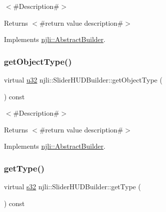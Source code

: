 $<$\#\+Description\#$>$

\begin{DoxyReturn}{Returns}
$<$\#return value description\#$>$ 
\end{DoxyReturn}


Implements \mbox{\hyperlink{classnjli_1_1_abstract_builder_a902f73ea78031b06aca183a417f3413b}{njli\+::\+Abstract\+Builder}}.

\mbox{\label{classnjli_1_1_slider_h_u_d_builder_afa0f286961acc9e1657cd801b11cc360}} 
\subsubsection{\texorpdfstring{get\+Object\+Type()}{getObjectType()}}
{\footnotesize\ttfamily virtual \mbox{\hyperlink{_util_8h_a10e94b422ef0c20dcdec20d31a1f5049}{u32}} njli\+::\+Slider\+H\+U\+D\+Builder\+::get\+Object\+Type (\begin{DoxyParamCaption}{ }\end{DoxyParamCaption}) const\hspace{0.3cm}{\ttfamily [virtual]}}

$<$\#\+Description\#$>$

\begin{DoxyReturn}{Returns}
$<$\#return value description\#$>$ 
\end{DoxyReturn}


Implements \mbox{\hyperlink{classnjli_1_1_abstract_builder_a0f2d344fcf697b167f4f2b1122b5fb33}{njli\+::\+Abstract\+Builder}}.

\mbox{\label{classnjli_1_1_slider_h_u_d_builder_ae79b4051ab1041b6d0e3d6b1775fe095}} 
\subsubsection{\texorpdfstring{get\+Type()}{getType()}}
{\footnotesize\ttfamily virtual \mbox{\hyperlink{_util_8h_aa62c75d314a0d1f37f79c4b73b2292e2}{s32}} njli\+::\+Slider\+H\+U\+D\+Builder\+::get\+Type (\begin{DoxyParamCaption}{ }\end{DoxyParamCaption}) const\hspace{0.3cm}{\ttfamily [virtual]}}

